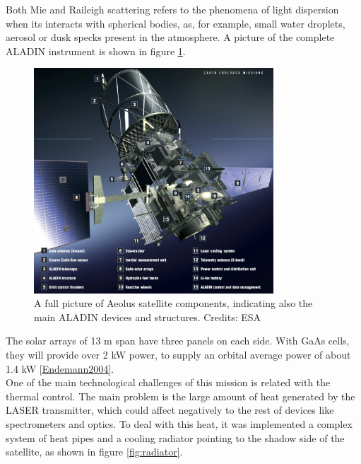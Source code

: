 Both Mie and Raileigh scattering refers to the phenomena of light dispersion when
its interacts with spherical bodies, as, for example, small water droplets, aerosol
or dusk specks present in the atmosphere. A picture of the complete ALADIN instrument
is shown in figure \ref{fig:full_payload}.\\

\begin{figure}[h]
	\centering
	\includegraphics[width=0.8\textwidth]{img/Aeolus_payload_components.png}
	\caption[ALADIN instrument components]{A full picture of Aeolus satellite
	components, indicating also the main ALADIN devices and structures. Credits: ESA \cite{full_payload}}
	\label{fig:full_payload}
\end{figure}

The solar arrays of 13 m span have three panels on each
side. With GaAs cells, they will provide over 2 kW power,
to supply an orbital average power of about 1.4 kW \ref{Endemann2004}.\\

One of the main technological challenges of this mission is related with the
thermal control. The main problem is the large amount of heat generated by the
LASER transmitter, which could affect negatively to the rest of devices like
spectrometers and optics. To deal with this heat, it was implemented a complex
system of heat pipes and a cooling radiator pointing to the shadow side of the
satellite, as shown in figure \ref{fig:radiator}.\\

